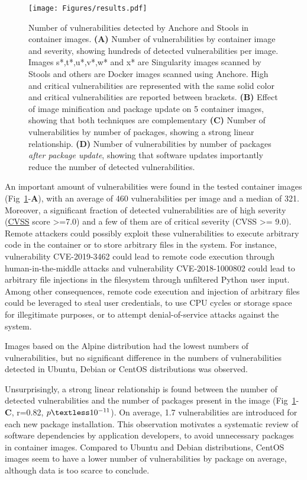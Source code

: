 \documentclass[a4paper,num-refs]{oup-contemporary}
\newcommand{\revision}[1]{\color{ao(english)}#1\color{black}\xspace}
\begin{document}
\begin{figure}
\texttt{[image: Figures/results.pdf]}
\caption{\label{fig:vulnerabilities} Number of vulnerabilities detected by
Anchore and Stools in container images. \textbf{(A)} Number of vulnerabilities by
container image and severity, showing hundreds of detected vulnerabilities
per image. Images s*,t*,u*,v*,w* and x* are Singularity images scanned by Stools and
others are Docker images scanned using Anchore. \revision{High and critical vulnerabilities are 
represented with the same solid color and critical vulnerabilities are reported between brackets.} \textbf{(B)} Effect of image minification and
package update on 5 container images, showing that both techniques are
complementary \textbf{(C)} Number of vulnerabilities by number of
packages, showing a strong linear relationship. \textbf{(D)} Number of
vulnerabilities by number of packages \emph{after package update}, showing that software updates 
importantly reduce the number of detected vulnerabilities.}
\end{figure}

An important amount of vulnerabilities were found in the tested container
 images (Fig~\ref{fig:vulnerabilities}-\textbf{A}), with an average of 460 vulnerabilities
  per image and a median of 321. Moreover, a significant fraction of detected vulnerabilities are
 of high severity
 (\href{https://www.first.org/cvss/specification-document}{CVSS} score
 >=7.0) and a few of them are of critical severity (CVSS >= 9.0). Remote
 attackers could possibly exploit these vulnerabilities to execute
 arbitrary code in the container \revision{or to store arbitrary files in the system}. 
 \revision{For instance, vulnerability CVE-2019-3462 could lead to remote
 code execution through human-in-the-middle attacks and vulnerability CVE-2018-1000802
 could lead to arbitrary file injections in the filesystem through unfiltered Python user input.}
 \revision{Among other consequences, remote code execution and injection of
 arbitrary files could be leveraged to steal user credentials, to use CPU
 cycles or storage space for illegitimate purposes, or to attempt
 denial-of-service attacks against the system.}
 
 Images based on the Alpine distribution 
 had the lowest numbers of vulnerabilities, but no significant difference
 in the numbers of vulnerabilities detected in 
 Ubuntu, Debian or CentOS distributions was observed.

Unsurprisingly, a strong linear relationship is found between the number of
detected vulnerabilities and the number of packages present in the
image (Fig~\ref{fig:vulnerabilities}-\textbf{C}, r=0.82,
$p\textless10^{-11}$). On average, 1.7 vulnerabilities are introduced for
each new package installation. This observation motivates a systematic
review of software dependencies by application developers, to avoid
unnecessary packages in container images. Compared to Ubuntu and Debian distributions,
CentOS images seem to have a lower number of vulnerabilities by package on
average, although data is too scarce to conclude.
\end{document}
